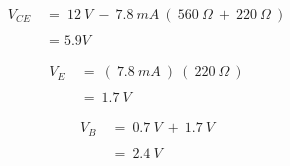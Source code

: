 {\bfseries\itshape{}} 

\begin{flushright}
{\bfseries\itshape{}} \hfill \break
\end{flushright}

\begin{ceqn}
\begin{align}
V_{CE}\ &=\ 12\ V\ -\ 7.8\ mA\ (\ 560\ \Omega\ +\ 220\ \Omega\ ) \\ \\
&= 5.9 V
\end{align}
\end{ceqn} \hfill \break

{\bfseries\itshape{}} 

\begin{flushright}
{\bfseries\itshape{}} \hfill \break
\end{flushright}

\begin{ceqn}
\begin{align}
V_{E}\ &=\ (\ 7.8\ mA\ )\ (\ 220\ \Omega\ ) \\ \\
&=\ 1.7\ V
\end{align}
\end{ceqn} \hfill \break

{\bfseries\itshape{}}

\begin{flushright}
{\bfseries\itshape{}} \hfill \break
\end{flushright}

\begin{ceqn}
\begin{align}
V_{B}\ &=\ 0.7\ V\ +\ 1.7\ V \\ \\
&=\ 2.4\ V
\end{align}
\end{ceqn} 

\pagebreak
